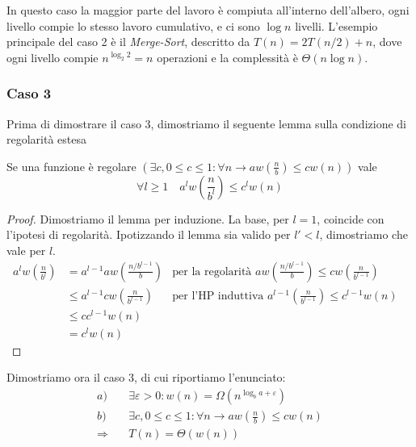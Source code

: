 In questo caso la maggior parte del lavoro è compiuta all'interno dell'albero, ogni livello compie lo stesso lavoro cumulativo, e ci sono $\log n$ livelli. L'esempio principale del caso 2 è il \textit{Merge-Sort}, descritto da $T(n)=2T(n/2)+n$, dove ogni livello compie $n^{\log_2 2}=n$ operazioni e la complessità è $\Theta (n \log n)$.

\subsubsection{Caso 3}
Prima di dimostrare il caso 3, dimostriamo il seguente lemma sulla condizione di regolarità estesa
\begin{lemma}
    Se una funzione è regolare $\left( \exists c, 0 \leq c \leq 1 : \forall n \rightarrow aw\left( \frac{n}{b} \right) \leq cw(n) \right) $
    vale \[ \forall l \geq 1 \quad a^l w\left( \frac{n}{b^l} \right) \leq c^l w(n) \]
    \label{teo:regestesa}
\end{lemma}
\begin{proof}
    Dimostriamo il lemma per induzione. La base, per $l=1$, coincide con l'ipotesi di regolarità. Ipotizzando il lemma sia valido per $l'<l$, dimostriamo che vale per $l$.
    \begin{align*}
        a^l w\left( \frac{n}{b^l} \right)
        &= a^{l-1} a w \left( \frac{n/b^{l-1}}{b} \right)
        & \text{per la regolarità } a w \left( \frac{n/b^{l-1}}{b} \right) \leq cw \left( \frac{n}{b^{l-1}} \right)&\\
        & \leq a^{l-1} cw \left( \frac{n}{b^{l-1}} \right)
        & \text{per l'HP induttiva } a^{l-1} \left( \frac{n}{b^{l-1}} \right) \leq c^{l-1}w(n)&\\
        & \leq cc^{l-1}w(n) \\
        & = c^lw\left( n \right)
    \end{align*}
\end{proof}
Dimostriamo ora il caso $3$, di cui riportiamo l'enunciato:
    \begin{align*}
        a) \quad &\exists \varepsilon > 0 : w(n) = \Omega(n^{\log_b a+\varepsilon}) \\
        b) \quad &\exists c, 0 \leq c \leq 1 : \forall n \rightarrow aw\left( \frac{n}{b} \right) \leq cw(n) \\
        \Rightarrow \quad & T(n) = \Theta \left( w(n) \right)
    \end{align*}
